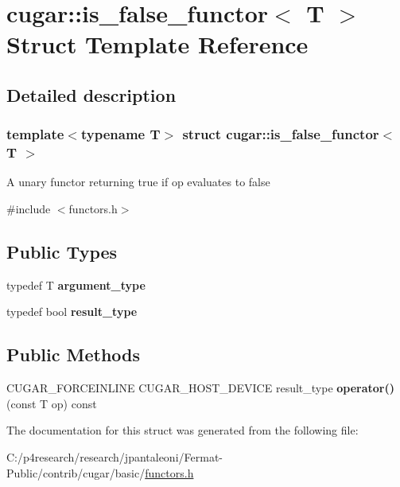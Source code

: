 \hypertarget{structcugar_1_1is__false__functor}{}\section{cugar\+:\+:is\+\_\+false\+\_\+functor$<$ T $>$ Struct Template Reference}
\label{structcugar_1_1is__false__functor}


\subsection{Detailed description}
\subsubsection*{template$<$typename T$>$\newline
struct cugar\+::is\+\_\+false\+\_\+functor$<$ T $>$}

A unary functor returning true if op evaluates to false 

{\ttfamily \#include $<$functors.\+h$>$}

\subsection*{Public Types}
\begin{DoxyCompactItemize}
\item 
\mbox{\label{structcugar_1_1is__false__functor_a6274a20c970846d954a05f0af41a6cd6}} 
typedef T {\bfseries argument\+\_\+type}
\item 
\mbox{\label{structcugar_1_1is__false__functor_acfff4cd346badb13c22837b10c96b38e}} 
typedef bool {\bfseries result\+\_\+type}
\end{DoxyCompactItemize}
\subsection*{Public Methods}
\begin{DoxyCompactItemize}
\item 
\mbox{\label{structcugar_1_1is__false__functor_aaba06740d6d89a8d321d5e1b40f79c6f}} 
C\+U\+G\+A\+R\+\_\+\+F\+O\+R\+C\+E\+I\+N\+L\+I\+NE C\+U\+G\+A\+R\+\_\+\+H\+O\+S\+T\+\_\+\+D\+E\+V\+I\+CE result\+\_\+type {\bfseries operator()} (const T op) const
\end{DoxyCompactItemize}


The documentation for this struct was generated from the following file\+:\begin{DoxyCompactItemize}
\item 
C\+:/p4research/research/jpantaleoni/\+Fermat-\/\+Public/contrib/cugar/basic/\hyperlink{functors_8h}{functors.\+h}\end{DoxyCompactItemize}
